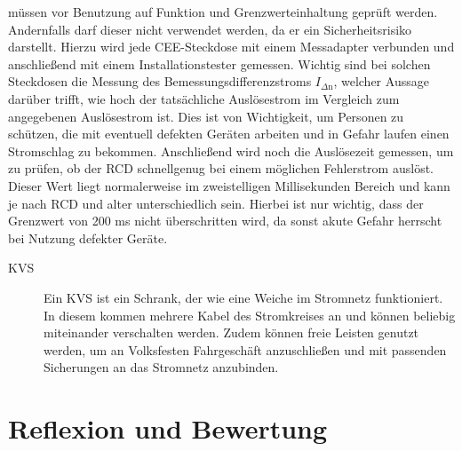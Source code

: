 müssen vor Benutzung auf Funktion und Grenzwerteinhaltung geprüft werden. Andernfalls darf dieser nicht verwendet werden, da er ein Sicherheitsrisiko 
darstellt. Hierzu wird jede CEE-Steckdose mit einem Messadapter verbunden und anschließend mit einem Installationstester gemessen. Wichtig sind bei solchen 
Steckdosen die Messung des Bemessungsdifferenzstroms $I_{\Delta \text{n}}$, welcher Aussage darüber trifft, wie hoch der tatsächliche Auslösestrom im Vergleich zum 
angegebenen Auslösestrom ist. Dies ist von Wichtigkeit, um Personen zu schützen, die mit eventuell defekten Geräten arbeiten und in Gefahr laufen einen 
Stromschlag zu bekommen. Anschließend wird noch die Auslösezeit gemessen, um zu prüfen, ob der RCD schnellgenug bei einem möglichen Fehlerstrom auslöst.
Dieser Wert liegt normalerweise im zweistelligen Millisekunden Bereich und kann je nach RCD und alter unterschiedlich sein. Hierbei ist nur wichtig, dass 
der Grenzwert von 200 ms nicht überschritten wird, da sonst akute Gefahr herrscht bei Nutzung defekter Geräte. \autocite{Rudnik.2020}
\begin{description}
\item[KVS] Ein KVS ist ein Schrank, der wie eine Weiche im Stromnetz funktioniert. In diesem kommen mehrere Kabel des Stromkreises an und können beliebig 
miteinander verschalten werden. Zudem können freie Leisten genutzt werden, um \zB an Volksfesten Fahrgeschäft anzuschließen und mit passenden Sicherungen 
an das Stromnetz anzubinden.
\end{description}

\section{Reflexion und Bewertung}

